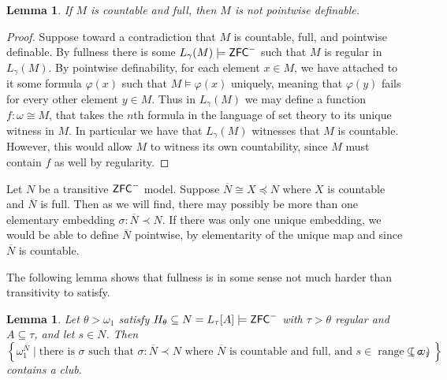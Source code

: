 \documentclass{amsart}
\newtheorem{lemma}[theorem]{Lemma}
\theoremstyle{definition}
\theoremstyle{remark}
\newcommand{\N}{{\overline{N}}}
\newcommand{\ZFC}{\textup{\ensuremath{\textsf{ZFC}}}}
\DeclareMathOperator{\ran}{range}
\newcommand{\st}{\; | \;}
\newcommand{\set}[2]{\left\{#1\st #2 \right\}}
\begin{document}
\begin{lemma} If $M$ is countable and full, then $M$ is not pointwise definable. \end{lemma}
\begin{proof} Suppose toward a contradiction that $M$ is countable, full, and pointwise definable. By fullness there is some $L_\gamma(M) \models \ZFC^-$ such that $M$ is regular in $L_\gamma(M)$. By pointwise definability, for each element $x \in M$, we have attached to it some formula $\varphi(x)$ such that $M \models \varphi(x)$ uniquely, meaning that $\varphi(y)$ fails for every other element $y \in M$. Thus in $L_\gamma(M)$ we may define a function $f: \omega \cong M$, that takes the $n$th formula in the language of set theory to its unique witness in $M$. In particular we have that $L_\gamma(M)$ witnesses that $M$ is countable. However, this would allow $M$ to witness its own countability, since $M$ must contain $f$ as well by regularity. \end{proof} 

Let $N$ be a transitive $\ZFC^-$ model. Suppose $\N \cong X \preccurlyeq N$ where $X$ is countable and $\N$ is full. Then as we will find, there may possibly be more than one elementary embedding $\sigma: \N \prec N$. 
If there was only one unique embedding, we would be able to define $\N$ pointwise, by elementarity of the unique map and since $\N$ is countable.

The following lemma shows that fullness is in some sense not much harder than transitivity to satisfy.

\begin{lemma} \label{lemma:fullclubs}
Let $\theta>\omega_1$ satisfy $H_\theta \subseteq N = L_\tau[A] \models \ZFC^-$ with $\tau>\theta$ regular and $A \subseteq \tau$, and let $s \in N$. Then 
$$ \set{ \omega_1^\N }{ \text{there is $\sigma$ such that $\sigma: \N \prec N$ where $\N$ is countable and full, and $s \in \ran(\sigma)$} } \subseteq \omega_1$$ contains a club.
\end{lemma} 
\end{document}
